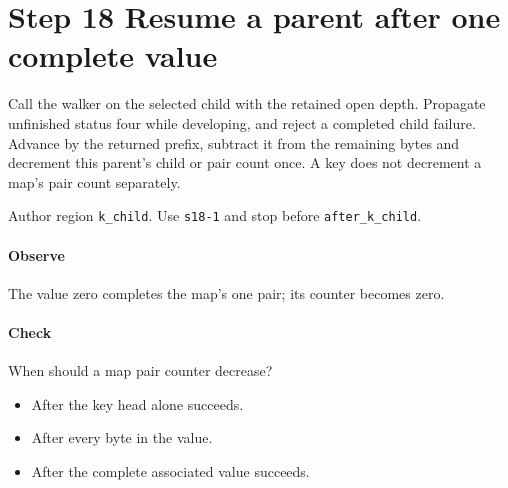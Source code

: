 \section{Step 18 Resume a parent after one complete value}\label{cbor-s18}
Call the walker on the selected child with the retained open depth. Propagate unfinished status four while developing, and reject a completed child failure. Advance by the returned prefix, subtract it from the remaining bytes and decrement this parent's child or pair count once. A key does not decrement a map's pair count separately.

Author region \texttt{k\_child}. Use \texttt{s18-1} and stop before \texttt{after\_k\_child}.

\paragraph{Observe} The value zero completes the map's one pair; its counter becomes zero.

\paragraph{Check} When should a map pair counter decrease?
\begin{itemize}
  \item[A.] After the key head alone succeeds.
  \item[B.] After every byte in the value.
  \item[C.] After the complete associated value succeeds.
\end{itemize}
